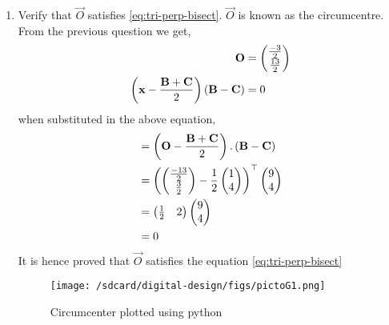 \documentclass[11pt]{book}
\begin{document}
\begin{enumerate}[label=\thesection.\arabic*.,ref=\thesection.\theenumi]
\item Verify that $\vec{O}$ satisfies
			\eqref{eq:tri-perp-bisect}.
$\vec{O}$ is known as the circumcentre.\\
 \solution
 From the previous question we get,
 \begin{align}
\mathbf{O}&=\begin{pmatrix}\frac{-3}{2}\\ \frac{13}{2}\end{pmatrix} \\
\left(\mathbf{x}-\frac{\mathbf{B}+\mathbf{C}}{2}\right)\left(\mathbf{B}-\mathbf{C}\right) &= 0
\end{align}
when substituted in the above equation,
\begin{align}
	&=\left(\mathbf{O}-\frac{\mathbf{B}+\mathbf{C}}{2}\right).\left(\mathbf{B}-\mathbf{C}\right)\\
	&=\left(\begin{pmatrix}\frac{-13}{2}\\ \frac{3}{2}\end{pmatrix}- \frac{1}{2}\begin{pmatrix}1\\4\end{pmatrix}\right)^{\top} \begin{pmatrix}9\\4\end{pmatrix}\\
	&=\begin{pmatrix}\frac{1}{2}& 2\end{pmatrix}\begin{pmatrix}9\\4\end{pmatrix}\\
	&=0
\end{align}
It is hence proved that $\vec{O}$ satisfies the equation \eqref{eq:tri-perp-bisect}
\begin{figure}[H]
\centering
\texttt{[image: /sdcard/digital-design/figs/pictoG1.png]}
\caption{Circumcenter plotted using python}
\label{fig:Circumcenter to BC}
\end{figure}


\end{enumerate}
\end{document}
